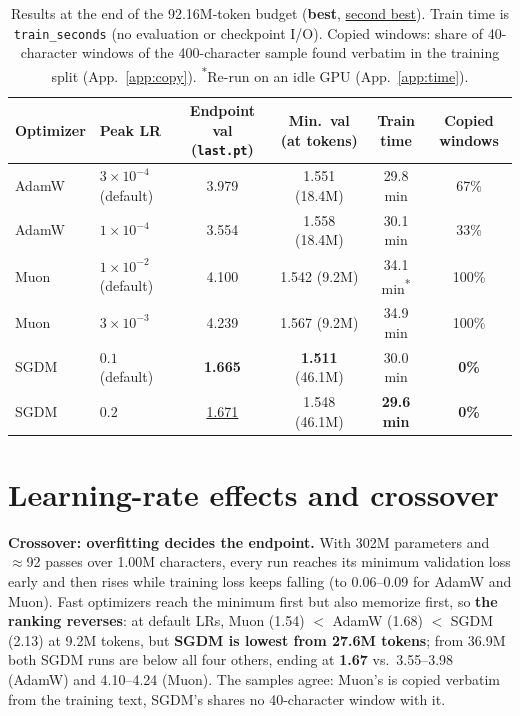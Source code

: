 \documentclass[10pt]{article}
\newcommand{\key}[1]{\textbf{#1}}
\begin{document}
\begin{table}[h]
\centering\small
\setlength{\tabcolsep}{6pt}\renewcommand{\arraystretch}{1.05}
\begin{tabular}{llcccc}
\toprule
Optimizer & Peak LR & \textbf{Endpoint val} (\texttt{last.pt}) & Min.\ val (at tokens) & \textbf{Train time} & Copied windows \\
\midrule
AdamW & $3\times10^{-4}$ (default) & 3.979 & 1.551 (18.4M) & 29.8 min & 67\% \\
AdamW & $1\times10^{-4}$ & 3.554 & 1.558 (18.4M) & 30.1 min & 33\% \\
\addlinespace[1pt]
Muon  & $1\times10^{-2}$ (default) & 4.100 & 1.542 (9.2M) & 34.1 min\textsuperscript{*} & 100\% \\
Muon  & $3\times10^{-3}$ & 4.239 & 1.567 (9.2M) & 34.9 min & 100\% \\
\addlinespace[1pt]
SGDM  & $0.1$ (default) & \textbf{1.665} & \textbf{1.511} (46.1M) & 30.0 min & \textbf{0\%} \\
SGDM  & $0.2$ & \underline{1.671} & 1.548 (46.1M) & \textbf{29.6 min} & \textbf{0\%} \\
\bottomrule
\end{tabular}
\caption{Results at the end of the 92.16M-token budget (\textbf{best}, \underline{second best}). Train time is \texttt{train\_seconds} (no evaluation or checkpoint I/O). Copied windows: share of 40-character windows of the 400-character sample found verbatim in the training split (App.~\ref{app:copy}). \textsuperscript{*}Re-run on an idle GPU (App.~\ref{app:time}).}
\label{tab:results}
\end{table}
\vspace{-14pt}

\section{Learning-rate effects and crossover}
\textbf{Crossover: overfitting decides the endpoint.} With 302M parameters and $\approx$92 passes over 1.00M characters, every run reaches its minimum validation loss early and then rises while training loss keeps falling (to 0.06--0.09 for AdamW and Muon). Fast optimizers reach the minimum first but also memorize first, so \key{the ranking reverses}: at default LRs, Muon (1.54) $<$ AdamW (1.68) $<$ SGDM (2.13) at 9.2M tokens, but \key{SGDM is lowest from 27.6M tokens}; from 36.9M both SGDM runs are below all four others, ending at \key{1.67} vs.\ 3.55--3.98 (AdamW) and 4.10--4.24 (Muon). The samples agree: Muon's is copied verbatim from the training text, SGDM's shares no 40-character window with it.
\end{document}
